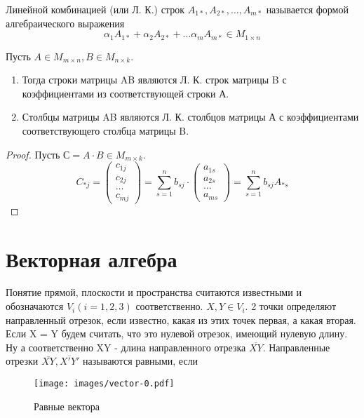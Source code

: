 	\begin{definition}
		Линейной комбинацией (или Л. К.) строк \(A_{1*}, A_{2*},\ldots, A_{m*}\) называется формой алгебраического выражения 
		\[\alpha_1 A_{1*}+\alpha_2 A_{2*} +\ldots \alpha_m A_{m*}\in M_{1\times n}\]
	\end{definition}
	\begin{proposition}
		Пусть \(A\in M_{m\times n}, B\in M_{n\times k}\).
		\begin{enumerate}
			\item Тогда строки матрицы AB являются Л. К. строк матрицы B с коэффициентами из соответствующей строки А.
			\item Столбцы матрицы AB являются Л. К. столбцов матрицы А с коэффициентами соответствующего столбца матрицы B.
		\end{enumerate} 
		\begin{proof}
			Пусть \(С = A\cdot B\in M_{m\times k}\). 
			\[C_{*j} = \begin{pmatrix}
				c_{1j} \\ c_{2j} \\ \ldots \\ c_{mj}
			\end{pmatrix} = \sum_{s=1}^{n}b_{sj}\cdot\begin{pmatrix}
				a_{1s} \\ a_{2s} \\ \ldots \\ a_{ms}
			\end{pmatrix} = \sum_{s=1}^{n}b_{sj}A_{*s}\]
		\end{proof}
	\end{proposition}
	\newpage
	\section{Векторная алгебра}
	Понятие прямой, плоскости и пространства считаются известными и обозначаются \(V_i(i = 1, 2, 3)\) соответственно.
	\(X, Y\in V_i\). 2 точки определяют направленный отрезок, если известно, какая из этих точек первая, а какая вторая. Если X = Y будем считать, что это нулевой отрезок, имеющий нулевую длину. Ну а соответственно XY - длина направленного отрезка \(\overline{XY}\). Направленные отрезки \(\overline{XY}, \overline{X'Y'}\) называются равными, если 
	\begin{wrapfigure}{r}{0.4\textwidth}
		\centering
		\texttt{[image: images/vector-0.pdf]}
		\caption{Равные вектора}
		\label{Vector0}
	\end{wrapfigure}
	
